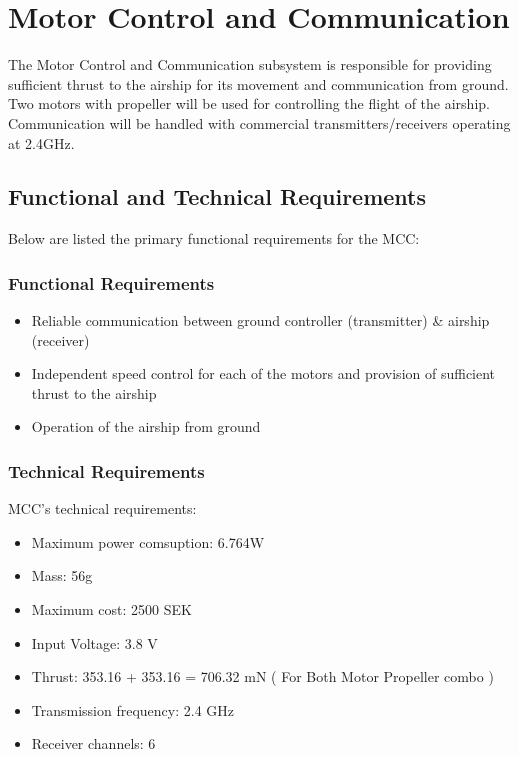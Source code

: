 \chapter{Motor Control and Communication}
\label{chap:mcc}
The Motor Control and Communication subsystem is responsible for providing sufficient thrust to the airship for its movement and communication from ground. Two motors with propeller will be used for controlling the flight of the airship. Communication will be handled with commercial transmitters/receivers operating at 2.4GHz. 

\section{Functional and Technical Requirements}

Below are listed the primary functional requirements for the MCC:

\subsection{Functional Requirements}

\begin{itemize}
\item Reliable communication between ground controller (transmitter) \& airship (receiver)
\item Independent speed control for each of the motors and provision of sufficient thrust to the airship
\item Operation of the airship from ground 
\end{itemize}


\subsection{Technical Requirements}

MCC's technical requirements:

\begin{itemize}
\item Maximum power comsuption: 6.764W
\item Mass: 56g
\item Maximum cost: 2500 SEK
\item Input Voltage: 3.8 V
\item Thrust: 353.16 + 353.16 = 706.32 mN ( For Both Motor Propeller combo )
\item Transmission frequency: 2.4 GHz
\item Receiver channels: 6
\end{itemize}

